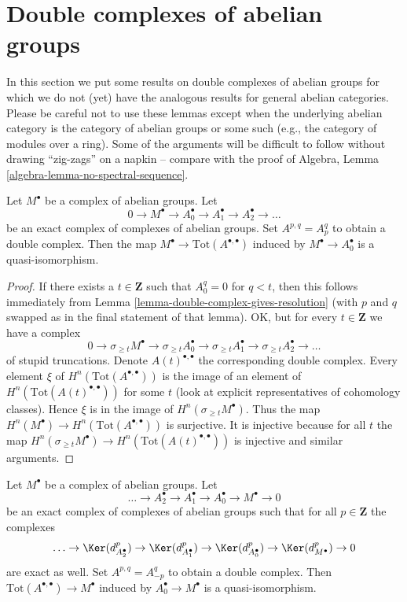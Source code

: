 \section{Double complexes of abelian groups}
\label{section-double-complexes-abelian-groups}

\noindent
In this section we put some results on double complexes of abelian groups
for which we do not (yet) have the analogous results for general abelian
categories. Please be careful not to use these lemmas except when the
underlying abelian category is the category of abelian groups or some
such (e.g., the category of modules over a ring). Some of the arguments
will be difficult to follow without drawing ``zig-zags'' on a napkin --
compare with the proof of
Algebra, Lemma \ref{algebra-lemma-no-spectral-sequence}.

\begin{lemma}
\label{lemma-right-resolution-gives-qis}
Let $M^\bullet$ be a complex of abelian groups. Let
$$
0 \to M^\bullet \to A_0^\bullet \to A_1^\bullet \to A_2^\bullet \to \ldots
$$
be an exact complex of complexes of abelian groups. Set
$A^{p, q} = A_p^q$ to obtain a double complex.
Then the map $M^\bullet \to \text{Tot}(A^{\bullet, \bullet})$
induced by $M^\bullet \to A_0^\bullet$ is a quasi-isomorphism.
\end{lemma}

\begin{proof}
If there exists a $t \in \mathbf{Z}$ such that $A_0^q = 0$ for $q < t$, then
this follows immediately from
Lemma \ref{lemma-double-complex-gives-resolution}
(with $p$ and $q$ swapped as in the final statement of that lemma).
OK, but for every $t \in \mathbf{Z}$ we have a complex
$$
0 \to
\sigma_{\geq t}M^\bullet \to
\sigma_{\geq t}A_0^\bullet \to
\sigma_{\geq t}A_1^\bullet \to
\sigma_{\geq t}A_2^\bullet \to \ldots
$$
of stupid truncations. Denote $A(t)^{\bullet, \bullet}$ the corresponding
double complex. Every element $\xi$ of $H^n(\text{Tot}(A^{\bullet, \bullet}))$
is the image of an element of $H^n(\text{Tot}(A(t)^{\bullet, \bullet}))$
for some $t$ (look at explicit representatives of cohomology classes).
Hence $\xi$ is in the image of $H^n(\sigma_{\geq t}M^\bullet)$.
Thus the map $H^n(M^\bullet) \to H^n(\text{Tot}(A^{\bullet, \bullet}))$
is surjective. It is injective because for all $t$ the map
$H^n(\sigma_{\geq t}M^\bullet) \to H^n(\text{Tot}(A(t)^{\bullet, \bullet}))$
is injective and similar arguments.
\end{proof}

\begin{lemma}
\label{lemma-good-resolution-gives-qis}
Let $M^\bullet$ be a complex of abelian groups. Let
$$
\ldots \to A_2^\bullet \to A_1^\bullet \to A_0^\bullet \to M^\bullet \to 0
$$
be an exact complex of complexes of abelian groups such that for all
$p \in \mathbf{Z}$ the complexes
$$
\ldots \to \Ker(d_{A_2^\bullet}^p) \to \Ker(d_{A_1^\bullet}^p)
\to \Ker(d_{A_0^\bullet}^p) \to \Ker(d_{M^\bullet}^p) \to 0
$$
are exact as well. Set $A^{p, q} = A_{-p}^q$ to obtain a double
complex. Then $\text{Tot}(A^{\bullet, \bullet}) \to M^\bullet$
induced by $A_0^\bullet \to M^\bullet$ is a quasi-isomorphism.
\end{lemma}

